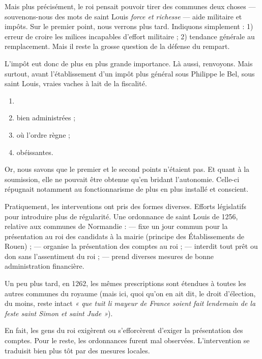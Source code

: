 \documentclass[french,twoside]{book} %
\begin{document}
Mais plus précisément, le roi pensait pouvoir tirer des communes deux choses — souvenons-nous des mots de saint Louis \emph{force et richesse} — aide militaire et impôts. Sur le premier point, nous verrons plus tard. Indiquons simplement : 1) erreur de croire les milices incapables d’effort militaire ; 2) tendance générale au remplacement. Mais il reste la grosse question de la défense du rempart.\par
L’impôt eut donc de plus en plus grande importance. Là aussi, renvoyons. Mais surtout, avant l’établissement d’un impôt plus général sous Philippe le Bel, sous saint Louis, vraies vaches à lait de la fiscalité.\par

\begin{enumerate}[itemsep=0pt,]
\item[] \hspace{-1.5em}{\bfseries Pour tout cela, cependant, il fallait des communes :}
\item bien administrées ;
\item où l’ordre règne ;
\item obéissantes.

\end{enumerate}\noindent Or, nous savons que le premier et le second points n’étaient pas. Et quant à la soumission, elle ne pouvait être obtenue qu’en bridant l’autonomie. Celle-ci répugnait notamment au fonctionnarisme de plus en plus installé et conscient.\par
Pratiquement, les interventions ont pris des formes diverses. Efforts législatifs pour introduire plus de régularité. Une ordonnance de saint Louis de 1256, relative aux communes de Normandie : —  
\label{p80} fixe un jour commun pour la présentation au roi des candidats à la mairie (principe des Établissements de Rouen) ; — organise la présentation des comptes au roi ; — interdit tout prêt ou don sans l’assentiment du roi ; — prend diverses mesures de bonne administration financière.\par
Un peu plus tard, en 1262, les mêmes prescriptions sont étendues à toutes les autres communes du royaume (mais ici, quoi qu’on en ait dit, le droit d’élection, du moins, reste intact \emph{« que tuit li mayeur de France soient fait lendemain de la feste saint Simon et saint Jude »}).\par
En fait, les gens du roi exigèrent ou s’efforcèrent d’exiger la présentation des comptes. Pour le reste, les ordonnances furent mal observées. L’intervention se traduisit bien plus tôt par des mesures locales.\par
\end{document}
